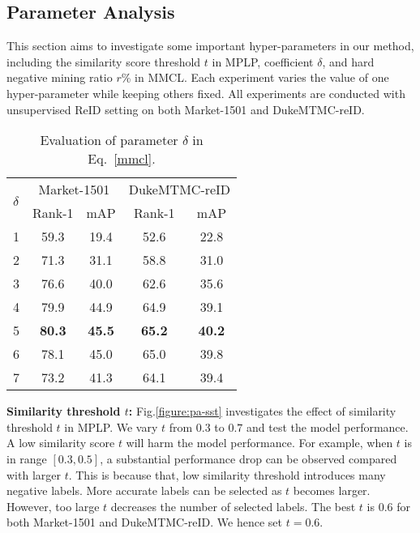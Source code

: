 \documentclass[10pt,twocolumn,letterpaper]{article}
\begin{document}
\vspace{-1mm}
\subsection{Parameter Analysis}\label{section:pa}
\vspace{-1mm}
This section aims to investigate some important hyper-parameters in our method, including the similarity score threshold $t$ in MPLP, coefficient $\delta$, and hard negative mining ratio $r$\% in MMCL. Each experiment varies the value of one hyper-parameter while keeping others fixed. All experiments are conducted with unsupervised ReID setting on both Market-1501 and DukeMTMC-reID.

\begin{table}
\footnotesize
\begin{center}
\begin{tabular}{p{1cm}<{\centering}|cc|cc}
\hline
\multirow{2}{*}{$\delta$} & \multicolumn{2}{c|}{Market-1501} & \multicolumn{2}{c}{DukeMTMC-reID}\\
\cline{2-5}
 & Rank-1 & mAP & Rank-1 & mAP  \\
\hline\hline
1 & 59.3 & 19.4 & 52.6 & 22.8 \\
2 & 71.3 & 31.1 & 58.8 & 31.0 \\
3 & 76.6 & 40.0 & 62.6 & 35.6 \\
4 & 79.9 & 44.9 & 64.9 & 39.1 \\
5 & \textbf{80.3} & \textbf{45.5} & \textbf{65.2} & \textbf{40.2}\\
6 & 78.1 & 45.0 & 65.0 & 39.8\\
7 & 73.2 & 41.3 & 64.1 & 39.4\\
\hline
\end{tabular}
\end{center}
\vspace{-2mm}
\caption{Evaluation of parameter $\delta$ in Eq.~\eqref{mmcl}.}
\vspace{-2mm}
\label{table:pa-delta}
\end{table}

\textbf{Similarity threshold $t$:} Fig.\ref{figure:pa-sst} investigates the effect of similarity threshold $t$ in MPLP. We vary $t$ from $0.3$ to $0.7$ and test the model performance. A low similarity score $t$ will harm the model performance. For example, when $t$ is in range $[0.3,0.5]$, a substantial performance drop can be observed compared with larger $t$. This is because that, low similarity threshold introduces many negative labels. More accurate labels can be selected as $t$ becomes larger. However, too large $t$ decreases the number of selected labels. The best $t$ is 0.6 for both Market-1501 and DukeMTMC-reID. We hence set $t=0.6$.
\end{document}
